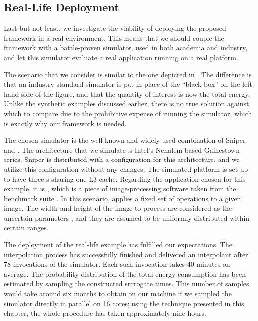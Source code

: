 \subsection{Real-Life Deployment}

Last but not least, we investigate the viability of deploying the proposed
framework in a real environment. This means that we should couple the framework
with a battle-proven simulator, used in both academia and industry, and let this
simulator evaluate a real application running on a real platform.

The scenario that we consider is similar to the one depicted in
. The difference is that an industry-standard simulator
is put in place of the ``black box'' on the left-hand side of the figure, and
that the quantity of interest \g is now the total energy. Unlike the synthetic
examples discussed earlier, there is no true solution against which to compare
due to the prohibitive expense of running the simulator, which is exactly why
our framework is needed.

The chosen simulator is the well-known and widely used combination of Sniper
\cite{carlson2011} and  \cite{li2009}. The architecture that we
simulate is Intel's Nehalem-based Gainestown series. Sniper is distributed with
a configuration for this architecture, and we utilize this configuration without
any changes. The simulated platform is set up to have three s sharing
one L3 cache. Regarding the application chosen for this example, it is
, which is a piece of image-processing software taken from the
 benchmark suite \cite{bienia2011}. In this scenario, 
applies a fixed set of operations to a given image. The width and height of the
image to process are considered as the uncertain parameters \vu, and they are
assumed to be uniformly distributed within certain ranges.

The deployment of the real-life example has fulfilled our expectations. The
interpolation process has successfully finished and delivered an interpolant
after 78 invocations of the simulator. Each such invocation takes 40 minutes on
average. The probability distribution of the total energy consumption has been
estimated by sampling the constructed surrogate  times. This number
of samples would take around six months to obtain on our machine if we sampled
the simulator directly in parallel on 16 cores; using the technique presented in
this chapter, the whole procedure has taken approximately nine hours.
